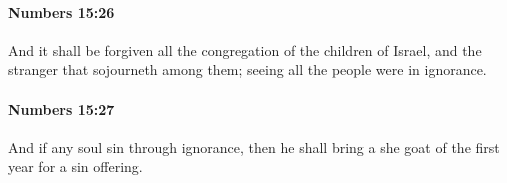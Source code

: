 		\paragraph{Numbers 15:26} %
			\label{NUMBERS-15-26}

			And it shall be forgiven all the congregation of the children of Israel, and the stranger that sojourneth among them; seeing all the people were in ignorance.


		\paragraph{Numbers 15:27} %
			\label{NUMBERS-15-27}

			And if any soul sin through ignorance, then he shall bring a she goat of the first year for a sin offering.


